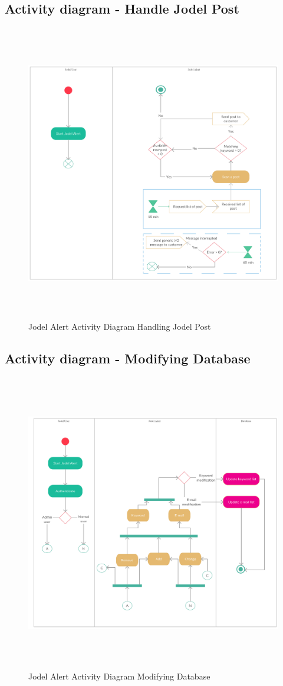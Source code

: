\documentclass[a4paper,12pt]{article}
\begin{document}
\subsection{Activity diagram - Handle Jodel Post}
\begin{figure}[!h]
	\centering
	\includegraphics[height=13cm]{img/Activity_diagram-Handling_Jodel_post.pdf}
	\caption{Jodel Alert Activity Diagram Handling Jodel Post}
	\label{Activity Diagram HJP}
\end{figure}
\clearpage
\subsection{Activity diagram - Modifying Database}
\begin{figure}[!h]
	\centering
	\includegraphics[height=13cm]{img/Activity_diagram-Modifying_database.pdf}
	\caption{Jodel Alert Activity Diagram Modifying Database}
	\label{Activity Diagram MD}
\end{figure}
\clearpage
\end{document}
